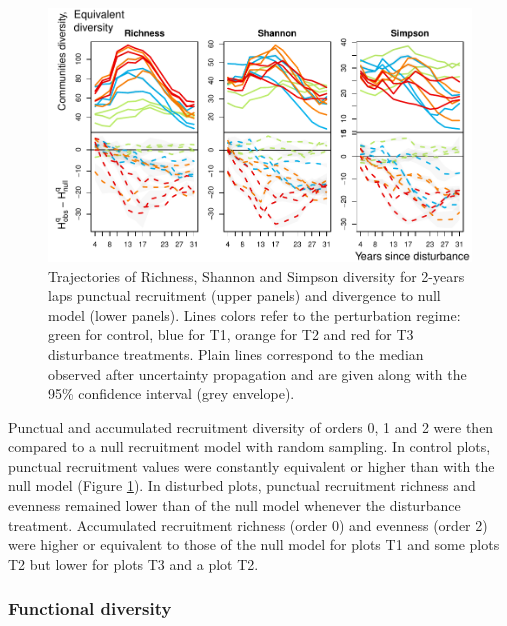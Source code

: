 \documentclass[fleqn,10pt]{ArtEcoFoG} %
\begin{document}
\begin{figure}

{\centering \includegraphics[width=0.8\linewidth]{RecruitmentTrajectories_files/figure-latex/Fig1-1} 

}

\caption{Trajectories of Richness, Shannon and Simpson diversity for 2-years laps punctual  recruitment (upper panels) and divergence to null model (lower panels). Lines colors refer to the perturbation regime: green for control, blue for T1, orange for T2 and red for T3 disturbance treatments. Plain lines correspond to the median observed after uncertainty propagation and are given along with the 95\% confidence interval (grey envelope).}\label{fig:Fig1}
\end{figure}

Punctual and accumulated recruitment diversity of orders 0, 1 and 2 were
then compared to a null recruitment model with random sampling. In
control plots, punctual recruitment values were constantly equivalent or
higher than with the null model (Figure \ref{fig:Fig1}). In disturbed
plots, punctual recruitment richness and evenness remained lower than of
the null model whenever the disturbance treatment. Accumulated
recruitment richness (order 0) and evenness (order 2) were higher or
equivalent to those of the null model for plots T1 and some plots T2 but
lower for plots T3 and a plot T2.

\subsubsection{Functional diversity}\label{functional-diversity}
\end{document}
